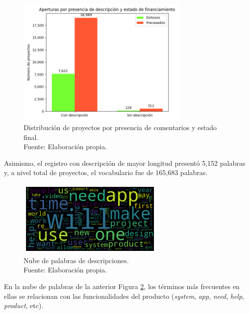 \begin{figure}[!ht]
	\begin{center}
		\includegraphics[width=0.75\textwidth]{4/figures/projects description by state.png}
		\caption[Distribución de proyectos por presencia de comentarios y estado final]{Distribución de proyectos por presencia de comentarios y estado final.\\
			Fuente: Elaboración propia.}
		\label{4:fig22}
	\end{center}
\end{figure}

Asimismo, el registro con descripción de mayor longitud presentó 5,152 palabras y, a nivel total de proyectos, el vocabulario fue de 165,683 palabras.

\begin{figure}[!ht]
	\begin{center}
		\includegraphics[width=0.64\textwidth]{4/figures/description_wordcloud_original_data.png}
		\caption[Nube de palabras de descripciones]{Nube de palabras de descripciones.\\
			Fuente: Elaboración propia.}
		\label{4:fig23}
	\end{center}
\end{figure}

En la nube de palabras de la anterior Figura \ref{4:fig23}, los términos más frecuentes en ellas se relacionan con las funcionalidades del producto (\textit{system}, \textit{app}, \textit{need}, \textit{help}, \textit{product}, etc).

